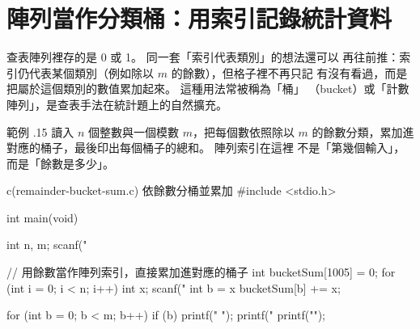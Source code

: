 \section{陣列當作分類桶：用索引記錄統計資料}
\label{sec:array-bucket}

查表陣列裡存的是 0 或 1。 同一套「索引代表類別」的想法還可以
再往前推：索引仍代表某個類別（例如除以 $m$ 的餘數），但格子裡不再只記
有沒有看過，而是把屬於這個類別的數值累加起來。 這種用法常被稱為「桶」
（bucket）或「計數陣列」，是查表手法在統計題上的自然擴充。

範例 \thechapter.15 讀入 $n$ 個整數與一個模數 $m$，把每個數依照除以 $m$
的餘數分類，累加進對應的桶子，最後印出每個桶子的總和。 陣列索引在這裡
不是「第幾個輸入」，而是「餘數是多少」。

\begin{center}
\label{fig:ch06-bucket-count-mod3}
\end{center}

\begin{example}{c}{(remainder-bucket-sum.c) 依餘數分桶並累加}
#include <stdio.h>

int main(void) {
    int n, m;
    scanf("%

    // 用餘數當作陣列索引，直接累加進對應的桶子
    int bucketSum[1005] = {0};
    for (int i = 0; i < n; i++) {
        int x;
        scanf("%
        int b = x %
        bucketSum[b] += x;
    }

    for (int b = 0; b < m; b++) {
        if (b) {
            printf(" ");
        }
        printf("%
    }
    printf("\n");
}
\end{example}


